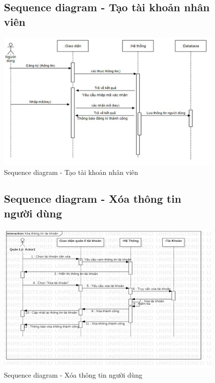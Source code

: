 \documentclass{report}
\begin{document}
\pagebreak
\begin{center}
	\begin{figure}[!htp]
		\subsection{Sequence diagram - Tạo tài khoản nhân viên}
		\begin{center}
			\includegraphics[scale=1]{Hinh/Sequence diagram Tạo tài khoản nhân viên.png}
		\end{center}
		\caption{Sequence diagram - Tạo tài khoản nhân viên}
	\end{figure}
\end{center}

\pagebreak
\begin{center}
	\begin{figure}[!htp]
		\subsection{Sequence diagram - Xóa thông tin người dùng}
		\begin{center}
			\includegraphics[scale=1]{Hinh/Sequence diagram Xóa thông tin người dùng.png}
		\end{center}
		\caption{Sequence diagram - Xóa thông tin người dùng}
	\end{figure}
\end{center}
\end{document}

